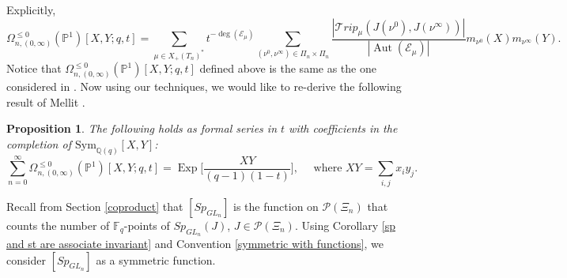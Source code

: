 \documentclass{amsart}
\newcommand{\cE}{\mathcal{E}}
\theoremstyle{plain}
\newtheorem{proposition}{Proposition}[section]
\theoremstyle{definition}
\theoremstyle{remark}
\DeclareMathOperator{\Exp}{Exp}
\DeclareMathOperator{\aut}{Aut}
\begin{document}
Explicitly,
\[
\Omega_{n,(0,\infty)}^{\leq 0}(\mathbb{P}^{1})[X,Y;q,t]
=
\displaystyle\sum_{\mu\in X_{+}(T_{n})^{*}}t^{-\deg(\cE_{\mu})}\sum_{(\nu^{0},\nu^{\infty})\in\Pi_{n}\times\Pi_{n}}\frac{|\mathcal{T}rip_{\mu}(J(\nu^{0}),J(\nu^{\infty}))|}{|\aut(\cE_{\mu})|}m_{\nu^{0}}(X)m_{\nu^{\infty}}(Y).
\]
Notice that $\Omega_{n,(0,\infty)}^{\leq 0}(\mathbb{P}^{1})[X,Y;q,t]$ defined above is the same as the one considered in \cite[Section 5.4]{Mel}.
Now using our techniques, we would like to re-derive the following result of Mellit \cite[Section 5.4]{Mel}.
\begin{proposition}\label{mellit's result}
The following holds as formal series in $t$ with coefficients in the completion of $\text{Sym}_{\mathbb{Q}(q)}[X,Y]$:
\[
\sum_{n=0}^{\infty}\Omega^{\leq 0}_{n,(0,\infty)}(\mathbb{P}^{1})[X,Y;q,t]
=
\Exp\Bigg[\frac{XY}{(q-1)(1-t)}\Bigg], \quad \text{ where } XY=\sum_{i,j}x_{i}y_{j}.
\]
\end{proposition}
Recall from Section \ref{coproduct} that $[Sp_{GL_{n}}]$ is the function on $\mathcal{P}(\Xi_{n})$ that counts the number of $\mathbb{F}_{q}$-points of $Sp_{GL_{n}}(J)$, $J\in\mathcal{P}(\Xi_{n})$. Using Corollary \ref{sp and st are associate invariant} and Convention \ref{symmetric with functions}, we consider $[Sp_{GL_{n}}]$ as a symmetric function.
\end{document}
